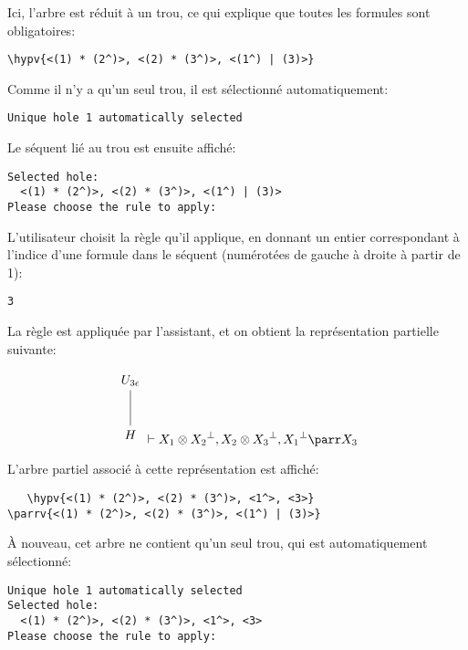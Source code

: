 \documentclass[11pt,a4paper]{article}
\theoremstyle{plain}
\theoremstyle{definition}
\theoremstyle{remark}
\newcommand*{\orth}{^\perp}
\newcommand*{\tensor}{\otimes}
\newcommand*{\hypv}[1]{\hypo{\vdash #1}}
\newcommand*{\parrv}[1]{\infer{1}[\ensuremath{\parr}]{\vdash #1}}
\newcommand*{\unknown}{H}
\begin{document}
Ici, l'arbre est réduit à un trou, ce qui explique que toutes les formules sont obligatoires:

\begin{verbatim}
\hypv{<(1) * (2^)>, <(2) * (3^)>, <(1^) | (3)>}
\end{verbatim}

Comme il n'y a qu'un seul trou, il est sélectionné automatiquement:

\begin{verbatim}
Unique hole 1 automatically selected
\end{verbatim}

Le séquent lié au trou est ensuite affiché:

\begin{verbatim}
Selected hole:
  <(1) * (2^)>, <(2) * (3^)>, <(1^) | (3)>
Please choose the rule to apply:
\end{verbatim}

L'utilisateur choisit la règle qu'il applique, en donnant un entier correspondant à l'indice d'une formule dans le séquent (numérotées de gauche à droite à partir de 1):

\begin{verbatim}
3
\end{verbatim}

La règle est appliquée par l'assistant, et on obtient la représentation partielle suivante:

\begin{equation*}
    \begin{tikzpicture}%
        [level 2/.style={sibling distance=3.5cm}]
        \node {$U_{3 \epsilon}$}
        child {node {$\unknown$}
        };
    \end{tikzpicture} \vdash X_1 \tensor {X_2}\orth, X_2 \tensor {X_3}\orth, {X_1}\orth \parr X_3
\end{equation*}

L'arbre partiel associé à cette représentation est affiché:

\begin{verbatim}
   \hypv{<(1) * (2^)>, <(2) * (3^)>, <1^>, <3>}
\parrv{<(1) * (2^)>, <(2) * (3^)>, <(1^) | (3)>}
\end{verbatim}

À nouveau, cet arbre ne contient qu'un seul trou, qui est automatiquement sélectionné:

\begin{verbatim}
Unique hole 1 automatically selected
Selected hole:
  <(1) * (2^)>, <(2) * (3^)>, <1^>, <3>
Please choose the rule to apply:
\end{verbatim}
\end{document}

